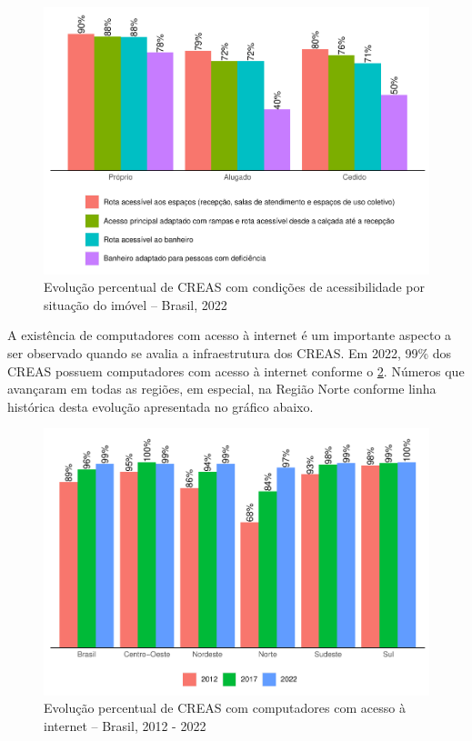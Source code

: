 \documentclass[
  brazilian]{report}
\begin{document}
\begin{figure}
\includegraphics{Censo-SUAS-2022_files/figure-latex/CREAS-acessibilidade-situacao-1} \caption[Evolução percentual de CREAS com condições de acessibilidade por situação do imóvel – Brasil, 2022]{Evolução percentual de CREAS com condições de acessibilidade por situação do imóvel – Brasil, 2022}\label{fig:CREAS-acessibilidade-situacao}
\end{figure}

A existência de computadores com acesso à internet é um importante
aspecto a ser observado quando se avalia a infraestrutura dos CREAS. Em
2022, 99\% dos CREAS possuem computadores com acesso à internet conforme
o \cref{fig:CREAS-internet-percentual}. Números que avançaram em todas
as regiões, em especial, na Região Norte conforme linha histórica desta
evolução apresentada no gráfico abaixo.

\begin{figure}
\includegraphics{Censo-SUAS-2022_files/figure-latex/CREAS-internet-percentual-1} \caption[Evolução percentual de CREAS com computadores com acesso à internet – Brasil, 2012 - 2022]{Evolução percentual de CREAS com computadores com acesso à internet – Brasil, 2012 - 2022}\label{fig:CREAS-internet-percentual}
\end{figure}
\end{document}
